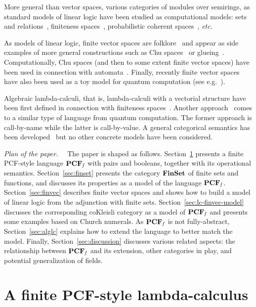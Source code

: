 \documentclass[10pt]{article}
\theoremstyle{plain}
\theoremstyle{definition}
\newcommand{\FinSet}{\mbox{\bf FinSet}}
\begin{document}
More general than vector spaces, various categories of modules over
semirings, as standard models of linear logic have been studied as
computational models: sets and relations~\cite{bucciarelli12}, finiteness
spaces~\cite{finiteness}, probabilistic coherent
spaces~\cite{pcs}, \textit{etc.}

As models of linear logic, 
finite vector spaces are folklore~\cite{pratt92mail} and
appear as side examples of more
general constructions such as Chu spaces~\cite{pratt94chu} or
glueing~\cite{hyland03glueing}.
Computationally, Chu spaces (and then to some extent finite vector
spaces) have been used in connection with automata~\cite{pratt94chu}.
Finally, recently finite vector spaces have also been used as a toy
model for quantum computation (see
e.g.~\cite{schumacher10modal,james11quantum}).

Algebraic lambda-calculi, that is, lambda-calculi with a vectorial
structure have been first defined in connection with finiteness
spaces~\cite{ehrhard03differential,vaux09}. Another
approach~\cite{ad08,adv11} comes to a similar type of language
from quantum computation. The former approach is call-by-name while
the latter is call-by-value. A general categorical
semantics has been developed~\cite{valiron13typed} but no other
concrete models have been considered.


\smallskip
\noindent
{\em Plan of the paper.}~~
The paper is shaped as follows. Section~\ref{sec:pcf} presents a
finite PCF-style language ${\bf PCF}_{\it f}$ with pairs and booleans, together
with its operational semantics. Section~\ref{sec:finset} presents the
category ${\FinSet}$ of finite sets and functions, and discusses its
properties as a model of the language
${\bf PCF}_{\it f}$. Section~\ref{sec:finvec} describes finite vector spaces and
shows how to build a model of linear logic from the adjunction with
finite sets. Section~\ref{sec:lc-finvec-model} discusses the
corresponding coKleisli category as a model of ${\bf PCF}_{\it f}$ and presents
some examples based on Church numerals. As ${\bf PCF}_{\it f}$ is not fully-abstract,
Section~\ref{sec:alglc} explains how to extend the language to better
match the model. Finally, Section~\ref{sec:discussion} discusses various 
related aspects: the
relationship between ${\bf PCF}_{\it f}$ and its extension, other categories in play, 
and potential generalization of fields.


\section{A finite PCF-style lambda-calculus}
\label{sec:pcf}
\end{document}
